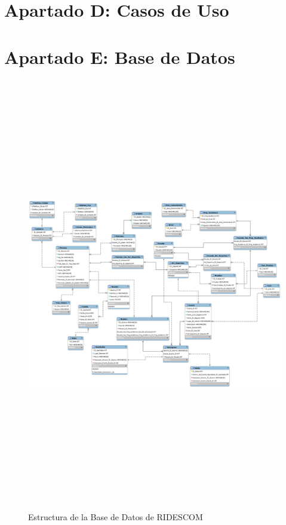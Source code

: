 	\section{Apartado D: Casos de Uso}
		\label{CasosdeUso}
		
		
		
		
		
		
		
		
		
		
		
	\pagebreak	
	
	\section{Apartado E: Base de Datos}
		\label{BasedeDatos}
		\begin{figure}[hbt!]
			\centering
			\includegraphics[angle=90, width=14cm, height=19cm]{Imagenes/bdrid.png}
			\caption{Estructura de la Base de Datos de RIDESCOM}
			\label{BaseDatos}
		\end{figure}
		
